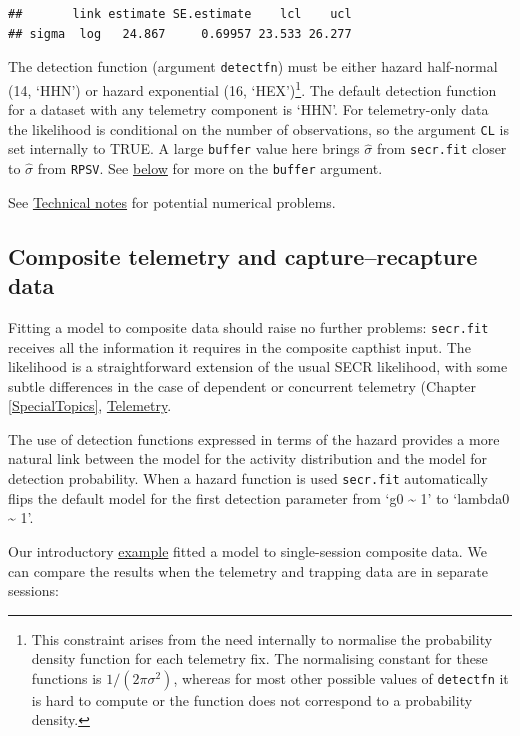 \documentclass[
]{book}
\begin{document}
\begin{verbatim}
##       link estimate SE.estimate    lcl    ucl
## sigma  log   24.867     0.69957 23.533 26.277
\end{verbatim}

The detection function (argument \texttt{detectfn}) must be either hazard half-normal (14, `HHN') or hazard exponential (16, `HEX')\footnote{This constraint arises from the need internally to normalise the probability density function for each telemetry fix. The normalising constant for these functions is \(1/(2\pi \sigma^2)\), whereas for most other possible values of \texttt{detectfn} it is hard to compute or the function does not correspond to a probability density.}. The default detection function for a dataset with any telemetry component is `HHN'. For telemetry-only data the likelihood is conditional on the number of observations, so the argument \texttt{CL} is set internally to TRUE. A large \texttt{buffer} value here brings \(\hat \sigma\) from \texttt{secr.fit} closer to \(\hat \sigma\) from \texttt{RPSV}. See \hyperref[habitatmask]{below} for more on the \texttt{buffer} argument.

See \hyperref[technotes]{Technical notes} for potential numerical problems.

\subsection{Composite telemetry and capture--recapture data}\label{composite-telemetry-and-capturerecapture-data}

Fitting a model to composite data should raise no further problems: \texttt{secr.fit} receives all the information it requires in the composite capthist input. The likelihood is a straightforward extension of the usual SECR likelihood, with some subtle differences in the case of dependent or concurrent telemetry (Chapter \ref{SpecialTopics}, \href{telemetrylikelihood}{Telemetry}.

The use of detection functions expressed in terms of the hazard provides a more natural link between the model for the activity distribution and the model for detection probability. When a hazard function is used \texttt{secr.fit} automatically flips the default model for the first detection parameter from `g0 \textasciitilde{} 1' to `lambda0 \textasciitilde{} 1'.

Our introductory \hyperref[telemetryexample]{example} fitted a model to single-session composite data. We can compare the results when the telemetry and trapping data are in separate sessions:
\end{document}
